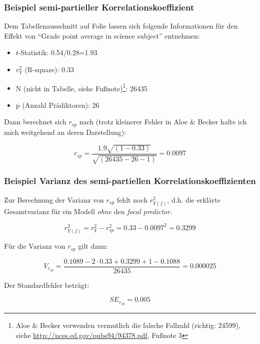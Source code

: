 \begin{frame}[plain]
  \frametitle{Beispiel semi-partieller Korrelationskoeffizient}
  
  Dem Tabellenausschnitt auf Folie \pageref{slide:chaney-tab} lassen sich
  folgende Informationen für den Effekt von "`Grade point average in science
  subject"' entnehmen:

  \begin{itemize}
  \item $t$-Statistik: 0.54/0.28=1.93
  \item $r_Y^2$ (R-square): 0.33
  \item N (nicht in Tabelle, siehe Fußnote)\footnote{Aloe \& Becker verwenden
      vermutlich die falsche Fallzahl (richtig: 24599), siehe
      \url{http://nces.ed.gov/pubs94/94378.pdf}, Fußnote 3}:
    26435
  \item p (Anzahl Prädiktoren): 26
  \end{itemize}
  
  Dann berechnet sich $r_{sp}$ nach (trotz kleinerer Fehler in Aloe \& Becker
  halte ich mich weitgehend an deren Darstellung):
  
  \begin{equation*}
    r_{sp}=\frac{1.9\sqrt{(1-0.33)}}{\sqrt{(26435-26-1)}}=0.0097
  \end{equation*}
    
  \citep[Quelle: ][346; kleine Typo in Beispielrechnung, $p=26$, nicht
  27]{aloe_advances_2011}
  
\end{frame}


\begin{frame}
  \frametitle{Beispiel Varianz des semi-partiellen Korrelationskoeffizienten}

  Zur Berechnung der Varianz von $r_{sp}$ fehlt noch $r^2_{Y(f)}$, d.h. die
  erklärte Gesamtvarianz für ein Modell \emph{ohne} den \emph{focal predictor}. 
  
  \begin{equation*}
    r^2_{Y(f)}=r^2_Y - r^2_{sp} = 0.33 - 0.0097^2 = 0.3299
  \end{equation*}
  
  Für die Varianz von $r_{sp}$ gilt dann:
  
  \begin{equation*}
    V_{r_{sp}} = \frac{0.1089 - 2 \cdot 0.33 + 0.3299 + 1 - 0.1088}{26435} = 
    0.000025 
  \end{equation*}
    
  Der Standardfehler beträgt:
  
  \begin{equation*}
    SE_{r_{sp}}=0.005
  \end{equation*}
  
  \citep[Quelle: ][347]{aloe_advances_2011}
  
\end{frame}



